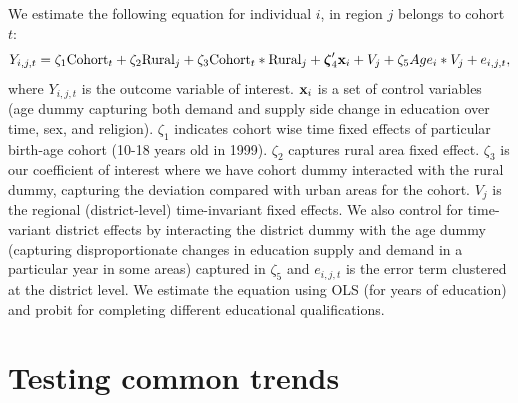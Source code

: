 \documentclass[12pt,letterpaper]{article}\usepackage[margin=1in]{geometry}
\newcommand{\bfzeta}{\ensuremath{\mbox{\boldmath $\zeta$}}}
\newcommand{\bfx}{\ensuremath{\mbox{\bf x}}}
\newcommand{\0}{\ensuremath{\mbox{\boldmath $0$}}}
\begin{document}


We estimate the following equation for individual $i$, in region $j$ belongs to cohort $t$:
\begin{equation}
Y_{i,j,t} = \zeta_{1}\textnormal{Cohort}_{t}+
\zeta_{2}\textnormal{Rural}_{j}+ \zeta_{3}\textnormal{Cohort}_{t}*\textnormal{Rural}_{j}+
\bfzeta'_{4}\bfx_{i}+V_{j}+\zeta_{5}Age_{i}*{V}_{j}+e_{i,j,t},
\label{longruneqn}
\end{equation}
where $Y_{i,j,t}$ is the outcome variable of interest. $\bfx_{i}$ is a set of control variables (age dummy capturing both demand and supply side change in education over time, sex, and religion). $\zeta_{1}$ indicates cohort wise time fixed effects of particular birth-age cohort (10-18 years old in 1999). $\zeta_{2}$ captures rural area fixed effect. $\zeta_{3}$ is our coefficient of interest where we have cohort dummy interacted with the rural dummy, capturing the deviation compared with urban areas for the cohort. $V_{j}$ is the regional (district-level) time-invariant fixed effects.  We also control for time-variant district effects by interacting the district dummy with the age dummy (capturing disproportionate changes in education supply and demand in a particular year in some areas) captured in $\zeta_{5}$ and $e_{i,j,t}$ is the error term clustered at the district level. We estimate the equation using OLS (for years of education) and probit for completing different educational qualifications. 

\section{Testing common trends}
\end{document}
